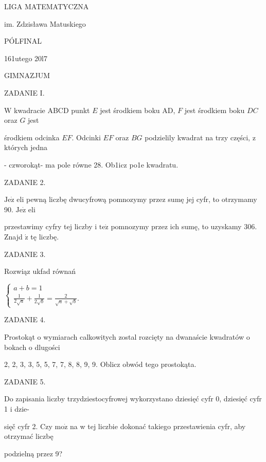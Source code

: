 \documentclass[a4paper,12pt]{article}
\begin{document}
LIGA MATEMATYCZNA

im. Zdzisława Matuskiego

PÓLFINAL

161utego 20l7

GIMNAZJUM

ZADANIE I.

$\mathrm{W}$ kwadracie ABCD punkt $E$ jest środkiem boku AD, $F$ jest środkiem boku $DC$ oraz $G$ jest

środkiem odcinka $EF$. Odcinki $EF$ oraz $BG$ podzielily kwadrat na trzy części, z których jedna

- czworokąt- ma pole równe 28. Ob1icz po1e kwadratu.

ZADANIE 2.

$\mathrm{J}\mathrm{e}\dot{\mathrm{z}}$ eli pewną liczbę dwucyfrową pomnozymy przez sumę jej cyfr, to otrzymamy 90. $\mathrm{J}\mathrm{e}\dot{\mathrm{z}}$ eli

przestawimy cyfry tej liczby i $\mathrm{t}\mathrm{e}\dot{\mathrm{z}}$ pomnozymy przez ich sumę, to uzyskamy 306. Znajd $\acute{\mathrm{z}}$ tę liczbę.

ZADANIE 3.

Rozwiąz ukfad równań

$\left\{\begin{array}{l}
a+b=1\\
\frac{1}{2\sqrt{a}}+\frac{1}{2\sqrt{b}}=\frac{2}{\sqrt{a}+\sqrt{b}}.
\end{array}\right.$

ZADANIE 4.

Prostokąt o wymiarach calkowitych zostal rozcięty na dwanaście kwadratów o bokach o dlugości

2, 2, 3, 3, 5, 5, 7, 7, 8, 8, 9, 9. Oblicz obwód tego prostokąta.

ZADANIE 5.

Do zapisania liczby trzydziestocyfrowej wykorzystano dziesięć cyfr 0, dziesięć cyfr 1 i dzie-

sięč cyfr 2. Czy $\mathrm{m}\mathrm{o}\dot{\mathrm{z}}$ na w tej liczbie dokonać takiego przestawienia cyfr, aby otrzymać liczbę

podzielną przez 9?
\end{document}
